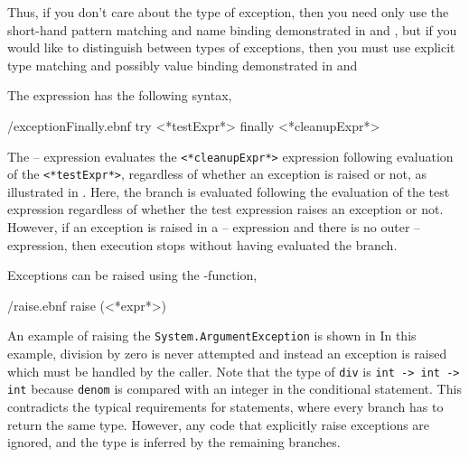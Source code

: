 \documentclass[fsharpNotes.tex]{subfiles}
\begin{document}
Thus, if you don't care about the type of exception, then you need only use the short-hand pattern matching and name binding demonstrated in  and , but if you would like to distinguish between types of exceptions, then you must use explicit type matching and possibly value binding demonstrated in  and 

The  expression has the following syntax,
%
\begin{verbatimwrite}{\ebnf/exceptionFinally.ebnf}
try
   <*testExpr*>
finally
   <*cleanupExpr*>
\end{verbatimwrite}
%
The -- expression evaluates the \lstinline[language=syntax]{<*cleanupExpr*>} expression following evaluation of the \lstinline[language=syntax]{<*testExpr*>}, regardless of whether an exception is raised or not, as illustrated in .
%
%
Here, the  branch is evaluated following the evaluation of the test expression regardless of whether the test expression raises an exception or not. However, if an exception is raised in a -- expression and there is no outer -- expression, then execution stops without having evaluated the  branch.


Exceptions can be raised using the -function,
%
\begin{verbatimwrite}{\ebnf/raise.ebnf}
raise (<*expr*>)
\end{verbatimwrite}
%
An example of raising the \lstinline{System.ArgumentException} is shown in 
% 
%
In this example, division by zero is never attempted and instead an exception is raised which must be handled by the caller. Note that the type of \lstinline!div! is \lstinline!int -> int -> int! because \lstinline{denom} is compared with an integer in the conditional statement. This contradicts the typical requirements for  statements, where every branch has to return the same type. However, any code that explicitly raise exceptions are ignored, and the type is inferred by the remaining branches.
\end{document}
